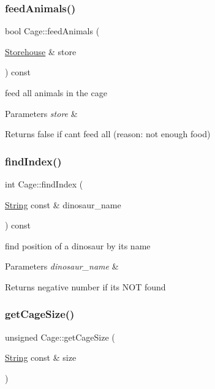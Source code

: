 \subsubsection{\texorpdfstring{feed\+Animals()}{feedAnimals()}}
{\footnotesize\ttfamily bool Cage\+::feed\+Animals (\begin{DoxyParamCaption}\item[{\hyperlink{classStorehouse}{Storehouse} \&}]{store }\end{DoxyParamCaption}) const}

feed all animals in the cage 
\begin{DoxyParams}{Parameters}
{\em store} & \\
\hline
\end{DoxyParams}
\begin{DoxyReturn}{Returns}
false if can\textquotesingle{}t feed all (reason\+: not enough food) 
\end{DoxyReturn}
\mbox{\label{classCage_a0e06d978eb325ece904e6511ff41dd6a}} 
\subsubsection{\texorpdfstring{find\+Index()}{findIndex()}}
{\footnotesize\ttfamily int Cage\+::find\+Index (\begin{DoxyParamCaption}\item[{\hyperlink{classString}{String} const \&}]{dinosaur\+\_\+name }\end{DoxyParamCaption}) const}

find position of a dinosaur by its name 
\begin{DoxyParams}{Parameters}
{\em dinosaur\+\_\+name} & \\
\hline
\end{DoxyParams}
\begin{DoxyReturn}{Returns}
negative number if its N\+OT found 
\end{DoxyReturn}
\mbox{\label{classCage_a2a8bc76e8e6e82510afef3384b4f4099}} 
\subsubsection{\texorpdfstring{get\+Cage\+Size()}{getCageSize()}}
{\footnotesize\ttfamily unsigned Cage\+::get\+Cage\+Size (\begin{DoxyParamCaption}\item[{\hyperlink{classString}{String} const \&}]{size }\end{DoxyParamCaption})\hspace{0.3cm}{\ttfamily [static]}}

